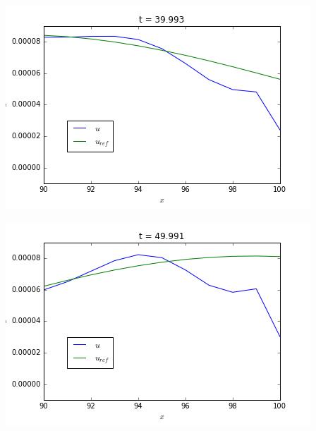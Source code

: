 \begingroup
	\noindent
	\begin{minipage}{.45\linewidth}
		\includegraphics[scale=.5]{figures/robin1A.png}	
	\end{minipage}
	\hfill
	\begin{minipage}{.45\linewidth}
		\includegraphics[scale=.5]{figures/robin1B.png}	
	\end{minipage}
\endgroup

